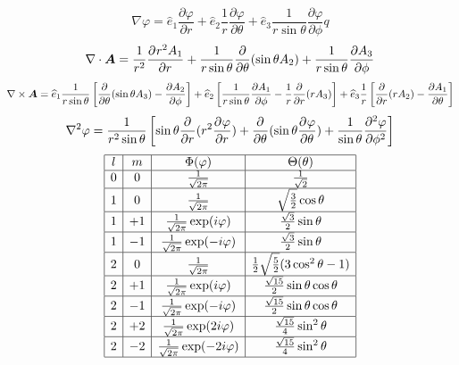 \documentclass[UTF8,8pt]{ctexart}
\begin{document}
\begin{multicols}{2}
    $$\nabla \varphi = \hat { e } _ { 1 } \frac { \partial \varphi } { \partial r } + \hat { e } _ { 2 } \frac { 1 } { r } \frac { \partial \varphi } { \partial \theta } + \hat { e } _ { 3 } \frac { 1 } { r \sin \theta } \frac { \partial \varphi } { \partial \phi }q$$
    $$\nabla \cdot \bm{ A } = \ff{r^2} \pp{r^2A_1}{r} + \frac { 1 } { r \sin \theta } \frac { \partial } { \partial \theta } ( \sin \theta A _ { 2 } ) + \frac { 1 } { r \sin \theta } \frac { \partial A _ { 3 } } { \partial \phi }$$
    $\dis\nabla \times \bm{ A }  = 
    \hat { e } _ { 1 } \frac { 1 } { r \sin \theta } \left[ \frac { \partial } { \partial \theta } ( \sin \theta A _ { 3 } ) - \frac { \partial A _ { 2 } } { \partial \phi } \right]  
    + \hat { e } _ { 2 } \left[ \frac { 1 } { r \sin \theta } \frac { \partial A _ { 1 } } { \partial \phi } - \frac { 1 } { r } \frac { \partial } { \partial r } ( r A _ { 3 } ) \right] 
    + \hat { e } _ { 3 } \frac { 1 } { r } \left[ \frac { \partial } { \partial r } ( r A _ { 2 } ) - \frac { \partial A _ { 1 } } { \partial \theta } \right] $
    $$\nabla^2\varphi=\ff{r^2\sin\t}\left[\sin\t\pp{}{r}(r^2\pp{\varphi}{r})+\pp{}{\t}(\sin\t\pp{\varphi}{\t})+\ff{\sin\t}\pp[2]{\varphi}{\phi}\right]$$
    $$
    \begin{array}{|c|c|c|c|c|c|}
    \hline
    l & m  & {  \Phi (\varphi )}                             & {  \Theta (\theta )}                                          \\ \hline
    0 & 0  & {  {\frac {1}{\sqrt {2\pi }}}}                  & {  {\frac {1}{\sqrt {2}}}}                                    \\ \hline
    1 & 0  & {  {\frac {1}{\sqrt {2\pi }}}}                  & {  {\sqrt {\frac {3}{2}}}\cos \theta }                        \\ \hline
    1 & +1 & {  {\frac {1}{\sqrt {2\pi }}}\exp(i\varphi )}   & {  {\frac {\sqrt {3}}{2}}\sin \theta }                        \\ \hline
    1 & -1 & {  {\frac {1}{\sqrt {2\pi }}}\exp(-i\varphi )}  & {  {\frac {\sqrt {3}}{2}}\sin \theta }                        \\ \hline
    2 & 0  & {  {\frac {1}{\sqrt {2\pi }}}}                  & {  {\frac {1}{2}}{\sqrt {\frac {5}{2}}}(3\cos ^{2}\theta -1)} \\ \hline
    2 & +1 & {  {\frac {1}{\sqrt {2\pi }}}\exp(i\varphi )}   & {  {\frac {\sqrt {15}}{2}}\sin \theta \cos \theta }           \\ \hline
    2 & -1 & {  {\frac {1}{\sqrt {2\pi }}}\exp(-i\varphi )}  & {  {\frac {\sqrt {15}}{2}}\sin \theta \cos \theta }           \\ \hline
    2 & +2 & {  {\frac {1}{\sqrt {2\pi }}}\exp(2i\varphi )}  & {  {\frac {\sqrt {15}}{4}}\sin ^{2}\theta }                   \\ \hline
    2 & -2 & {  {\frac {1}{\sqrt {2\pi }}}\exp(-2i\varphi )} & {  {\frac {\sqrt {15}}{4}}\sin ^{2}\theta }                   \\ \hline
    \end{array}$$
    
\end{multicols}
\end{document}
